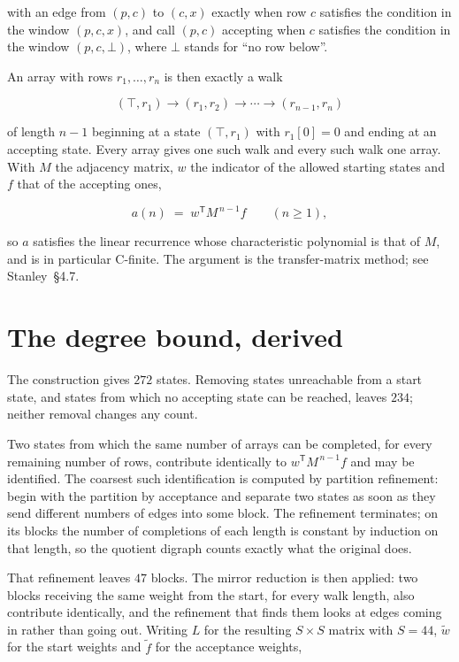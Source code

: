 \documentclass[11pt]{article}
\theoremstyle{definition}
\begin{document}
with an edge from $(p,c)$ to $(c,x)$ exactly when row $c$ satisfies the condition in the window $(p,c,x)$, and call $(p,c)$ accepting when $c$ satisfies the condition in the window $(p,c,\bot)$, where $\bot$ stands for ``no row below''.

An array with rows $r_1,\dots,r_n$ is then exactly a walk

\[(\top,r_1) \to (r_1,r_2) \to \cdots \to (r_{n-1},r_n)\]

of length $n-1$ beginning at a state $(\top,r_1)$ with $r_1[0]=0$ and ending at an accepting state. Every array gives one such walk and every such walk one array. With $M$ the adjacency matrix, $w$ the indicator of the allowed starting states and $f$ that of the accepting ones,

\[a(n) \;=\; w^{\mathsf T} M^{\,n-1} f \qquad (n \ge 1),\]

so $a$ satisfies the linear recurrence whose characteristic polynomial is that of $M$, and is in particular C-finite. The argument is the transfer-matrix method; see Stanley~\S4.7.

\section{The degree bound, derived}

The construction gives $272$ states. Removing states unreachable from a start state, and states from which no accepting state can be reached, leaves $234$; neither removal changes any count.

Two states from which the same number of arrays can be completed, for every remaining number of rows, contribute identically to $w^{\mathsf T}M^{\,n-1}f$ and may be identified. The coarsest such identification is computed by partition refinement: begin with the partition by acceptance and separate two states as soon as they send different numbers of edges into some block. The refinement terminates; on its blocks the number of completions of each length is constant by induction on that length, so the quotient digraph counts exactly what the original does.

That refinement leaves $47$ blocks. The mirror reduction is then applied: two blocks receiving the same weight from the start, for every walk length, also contribute identically, and the refinement that finds them looks at edges coming in rather than going out. Writing $L$ for the resulting $S \times S$ matrix with $S = 44$, $\tilde w$ for the start weights and $\tilde f$ for the acceptance weights,
\end{document}
